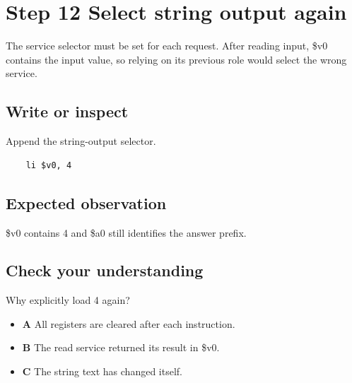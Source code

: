 \section{Step 12 Select string output
  again}\label{001-console-calculation-s12-step-12-select-string-output-again}

The service selector must be set for each request. After reading input,
\$v0 contains the input value, so relying on its previous role would
select the wrong service.

\subsection{Write or
  inspect}\label{001-console-calculation-s12-write-or-inspect}

Append the string-output selector.

\begin{verbatim}
    li $v0, 4
\end{verbatim}

\subsection{Expected
  observation}\label{001-console-calculation-s12-expected-observation}

\$v0 contains 4 and \$a0 still identifies the answer prefix.

\subsection{Check your
  understanding}\label{001-console-calculation-s12-check-your-understanding}

Why explicitly load 4 again?

\begin{itemize}
  \tightlist
  \item
        \textbf{A} All registers are cleared after each instruction.
  \item
        \textbf{B} The read service returned its result in \$v0.
  \item
        \textbf{C} The string text has changed itself.
\end{itemize}
